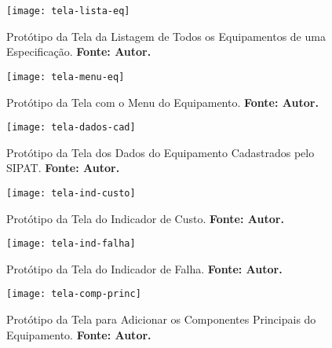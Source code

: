 \begin{apendicesenv}

\graphicspath{{figuras/prototipos/}}
\begin{figure}[H]
\centering
\texttt{[image: tela-lista-eq]}
\caption{Protótipo da Tela da Listagem de Todos os Equipamentos de uma Especificação. \textbf{Fonte: Autor.}}
\label{tela-lista-eq}
\end{figure}



\graphicspath{{figuras/prototipos/}}
\begin{figure}[H]
\centering
\texttt{[image: tela-menu-eq]}
\caption{Protótipo da Tela com o Menu do Equipamento. \textbf{Fonte: Autor.}}
\label{tela-menu-eq}
\end{figure}


\graphicspath{{figuras/prototipos/}}
\begin{figure}[H]
\centering
\texttt{[image: tela-dados-cad]}
\caption{Protótipo da Tela dos Dados do Equipamento Cadastrados pelo SIPAT. \textbf{Fonte: Autor.}}
\label{tela-dados-cad}
\end{figure}



\graphicspath{{figuras/prototipos/}}
\begin{figure}[H]
\centering
\texttt{[image: tela-ind-custo]}
\caption{Protótipo da Tela do Indicador de Custo. \textbf{Fonte: Autor.}}
\label{tela-ind-custo}
\end{figure}

\graphicspath{{figuras/prototipos/}}
\begin{figure}[H]
\centering
\texttt{[image: tela-ind-falha]}
\caption{Protótipo da Tela do Indicador de Falha. \textbf{Fonte: Autor.}}
\label{tela-ind-falha}
\end{figure}



\graphicspath{{figuras/prototipos/}}
\begin{figure}[H]
\centering
\texttt{[image: tela-comp-princ]}
\caption{Protótipo da Tela para Adicionar os Componentes Principais do Equipamento. \textbf{Fonte: Autor.}}
\label{tela-comp-princ}
\end{figure}


\end{apendicesenv}
